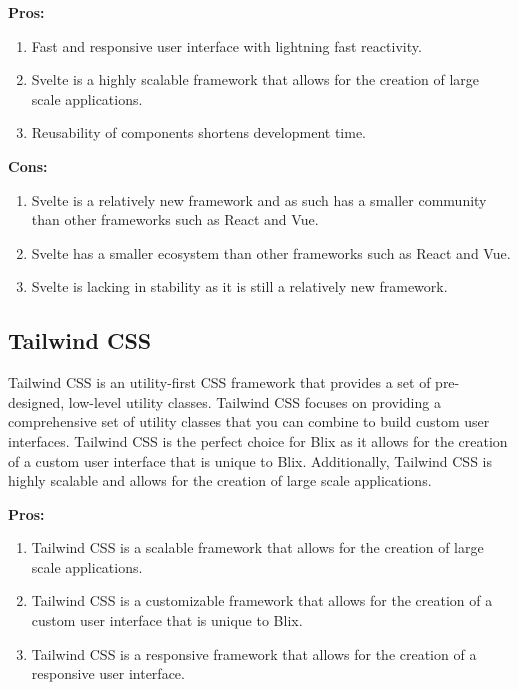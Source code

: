 \documentclass[11pt,a4paper]{article}
\begin{document}
\textbf{Pros:}
\begin{enumerate}[label*=\arabic*.]
	\item[\textbullet] Fast and responsive user interface with lightning fast
	reactivity. 
	\item[\textbullet] Svelte is a highly scalable framework that allows for the
	creation of large scale applications.
	\item[\textbullet] Reusability of components shortens development time.
\end{enumerate}


\textbf{Cons:}
\begin{enumerate}[label*=\arabic*.]
	\item[\textbullet] Svelte is a relatively new framework and as such has a
	smaller community than other frameworks such as React and Vue.
	\item[\textbullet] Svelte has a smaller ecosystem than other frameworks such
	as React and Vue.
	\item[\textbullet] Svelte is lacking in stability as it is still a
	relatively new framework.
\end{enumerate}

\subsection{Tailwind CSS}
Tailwind CSS is an utility-first CSS framework that provides a set of
pre-designed, low-level utility classes. Tailwind CSS focuses on providing a
comprehensive set of utility classes that you can combine to build custom user
interfaces. Tailwind CSS is the perfect choice for Blix as it allows for the
creation of a custom user interface that is unique to Blix. Additionally,
Tailwind CSS is highly scalable and allows for the creation of large scale
applications.

\textbf{Pros:}
\begin{enumerate}[label*=\arabic*.]
	\item[\textbullet] Tailwind CSS is a scalable framework that allows for the
	creation of large scale applications.
	\item[\textbullet] Tailwind CSS is a customizable framework that allows for
	the creation of a custom user interface that is unique to Blix.
	\item[\textbullet] Tailwind CSS is a responsive framework that allows for
	the creation of a responsive user interface.
\end{enumerate}
\end{document}
